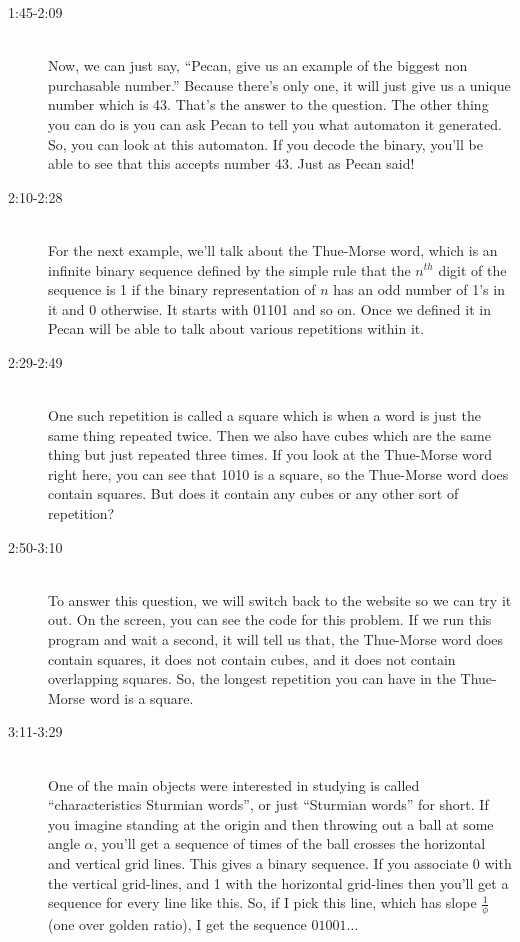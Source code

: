 \documentclass[12pt]{article}
\begin{document}
\begin{description}
\item[1:45-2:09]\hfill \\
Now, we can just say, ``Pecan, give us an example of the biggest non purchasable number.'' Because there's only one, it will just give us a unique number which is 43. That's the answer to the question. The other thing you can do is you can ask Pecan to tell you what automaton it generated. So, you can look at this automaton. If you decode the binary, you'll be able to see that this accepts number 43. Just as Pecan said! 


\item[2:10-2:28]\hfill \\
For the next example, we'll talk about the Thue-Morse word, which is an infinite binary sequence defined by the simple rule that the $n^{th}$ digit of the sequence is 1 if the binary representation of $n$ has an odd number of 1's in it and 0 otherwise. It starts with 01101 and so on. Once we defined it in Pecan will be able to talk about various repetitions within it.

\item[2:29-2:49]\hfill \\
One such repetition is called a square which is when a word is just the same thing repeated twice. Then we also have cubes which are the same thing but just repeated three times. If you look at the Thue-Morse word right here, you can see that 1010 is a square, so the Thue-Morse word does contain squares. But does it contain any cubes or any other sort of repetition? 

\item[2:50-3:10]\hfill \\
To answer this question, we will switch back to the website so we can try it out. On the screen, you can see the code for this problem. If we run this program and wait a second, it will tell us that, the Thue-Morse word does contain squares, it does not contain cubes, and it does not contain overlapping squares. So, the longest repetition you can have in the Thue-Morse word is a square. 


\item[3:11-3:29]\hfill \\
One of the main objects were interested in studying is called ``characteristics Sturmian words'', or just ``Sturmian words'' for short. If you imagine standing at the origin and then throwing out a ball at some angle $\alpha$, you'll get a sequence of times of the ball crosses the horizontal and vertical grid lines. This gives a binary sequence. If you associate 0 with the vertical grid-lines, and 1 with the horizontal grid-lines then you'll get a sequence for every line like this. So, if I pick this line, which has slope $\frac{1}{\phi}$ (one over golden ratio), I get the sequence $01001\dots$


\end{description}
\end{document}
